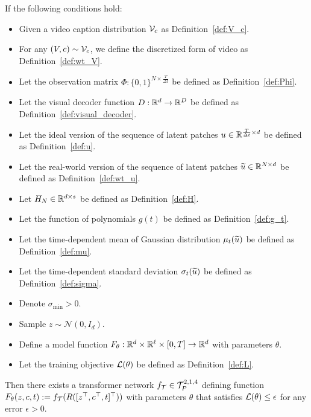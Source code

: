 \begin{theorem}\label{thm:uat}
    If the following conditions hold:
    \begin{itemize}
        \item Given a video caption distribution ${\cal V}_c$ as Definition~\ref{def:V_c}.
        \item For any $(V, c) \sim {\cal V}_c$, we define the discretized form of video as Definition~\ref{def:wt_V}.
        \item Let the observation matrix $\Phi: \{0, 1\}^{N \times \frac{T}{\Delta t}}$ be defined as Definition~\ref{def:Phi}.
        \item Let the visual decoder function $D: \mathbb{R}^d \rightarrow \mathbb{R}^D$ be defined as Definition~\ref{def:visual_decoder}.
        \item Let the ideal version of the sequence of latent patches $u \in \mathbb{R}^{\frac{T}{\Delta t} \times d}$ be defined as Definition~\ref{def:u}.
        \item Let the real-world version of the sequence of latent patches $\widetilde{u} \in \mathbb{R}^{N \times d}$ be defined as Definition~\ref{def:wt_u}.
        \item Let $H_N \in \mathbb{R}^{d \times s}$ be defined as Definition~\ref{def:H}.
        \item Let the function of polynomials $g(t)$ be defined as Definition~\ref{def:g_t}.
        \item Let the time-dependent mean of Gaussian distribution $\mu_t(\widetilde{u})$ be defined as Definition~\ref{def:mu}.
        \item Let the time-dependent standard deviation $\sigma_t(\widetilde{u})$ be defined as Definition~\ref{def:sigma}.
        \item Denote $\sigma_{\min} > 0$.
        \item Sample $z \sim \mathcal{N}(0, I_d)$.
        \item Define a model function $F_\theta: \mathbb{R}^d \times \mathbb{R}^\ell \times [0, T] \rightarrow \mathbb{R}^d$ with parameters $\theta$.
        \item Let the training objective ${\cal L}(\theta)$ be defined as Definition~\ref{def:L}.
    \end{itemize}
    Then there exists a transformer network $f_{\cal T} \in {\cal T}_{P}^{2, 1, 4}$ defining function $F_\theta(z, c, t) := f_{\cal T}( R([z^\top, c^\top, t]^\top) )$ with parameters $\theta$ that satisfies ${\cal L}(\theta) \leq \epsilon$ for any error $\epsilon > 0$.
\end{theorem}

